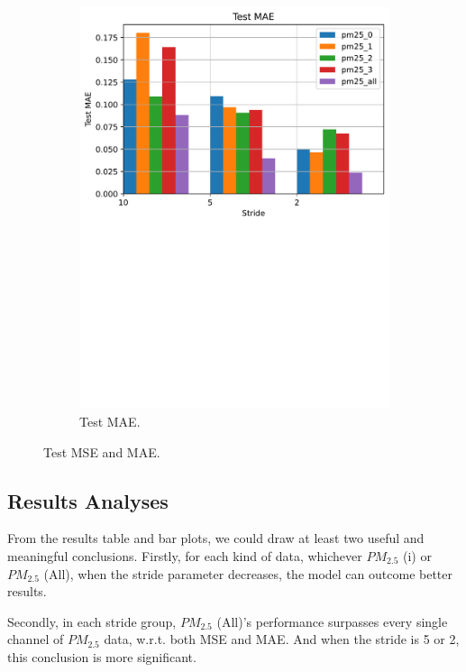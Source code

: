 \begin{figure}[!htbp]
\begin{subfigure}[!htbp]{.45\textwidth}
        \includegraphics[width=\textwidth]{fig/results/test_mae.pdf}
        \caption{Test MAE.}
        \label{fig:test_mae}
    \end{subfigure}
    \caption{Test MSE and MAE.}
    \label{fig:test_mse_mae}
\end{figure}

\subsection{Results Analyses}

From the results table and bar plots, we could draw at least two useful and meaningful conclusions. Firstly, for each kind of data, whichever $PM_{2.5}$ (i) or $PM_{2.5}$ (All), when the stride parameter decreases, the model can outcome better results.

Secondly, in each stride group, $PM_{2.5}$ (All)'s performance surpasses every single channel of $PM_{2.5}$ data, w.r.t. both MSE and MAE. And when the stride is 5 or 2, this conclusion is more significant.

